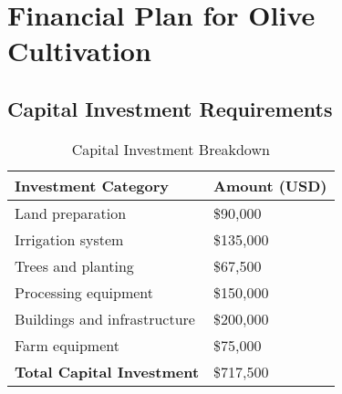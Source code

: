 \section{Financial Plan for Olive Cultivation}

\subsection{Capital Investment Requirements}

\begin{table}[h]
\centering
\begin{tabular}{|p{6cm}|p{6cm}|}
\hline
\textbf{Investment Category} & \textbf{Amount (USD)} \\
\hline
Land preparation & \$90,000 \\
Irrigation system & \$135,000 \\
Trees and planting & \$67,500 \\
Processing equipment & \$150,000 \\
Buildings and infrastructure & \$200,000 \\
Farm equipment & \$75,000 \\
\hline
\textbf{Total Capital Investment} & \$717,500 \\
\hline
\end{tabular}
\caption{Capital Investment Breakdown}
\end{table}

